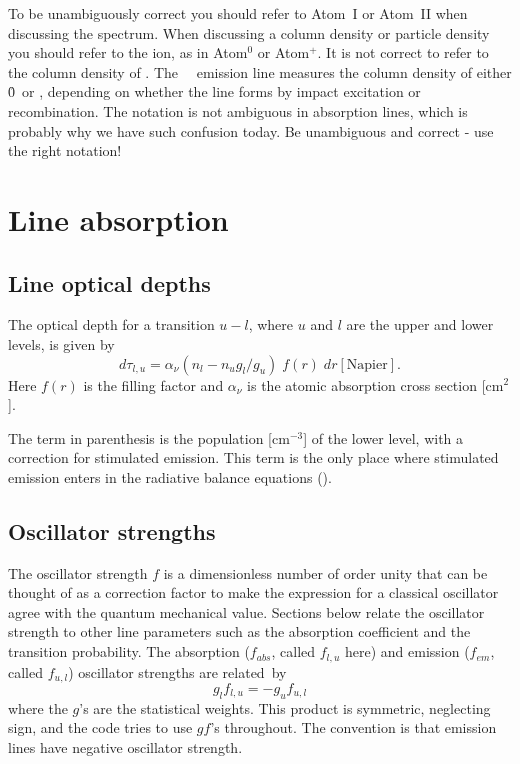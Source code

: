 To be unambiguously correct you should refer to Atom~I or Atom~II when
discussing the spectrum.
When discussing a column density or particle
density you should refer to the ion, as in Atom$^0$ or Atom$^+$.
It is not correct
to refer to the column density of \hi.
The \la\ \hi\  emission
line measures the column density of either \h0\ or \hplus,
depending on whether the line forms by impact excitation or recombination.
The notation is not ambiguous in absorption lines, which is probably why
we have such confusion today.
Be unambiguous and correct - use the right notation!

\section{Line absorption }

\subsection{Line optical depths}

The optical depth for a transition $u-l$,  where $u$ and $l$ are the upper
and lower levels, is given by
\begin{equation}
\label{eqn:OpticalDepthIncrement}
d{\tau _{l,u}} = {\alpha _\nu }\left( {{n_l} - {n_u}{g_l}/{g_u}}
\right)\;f(r)\;dr
 [\mathrm{Napier}].
\end{equation}
Here $f (r)$ is the filling factor and $\alpha _\nu$ is the
atomic absorption cross section [cm$^2$].

The term in parenthesis is the population [cm$^{-3}$] of the lower level,
with a correction for stimulated emission.
This term is the only place where
stimulated emission enters in the radiative balance equations (\citealp{Elitzur1983}).

\subsection{Oscillator strengths}

The oscillator strength $f$ is a dimensionless number of order unity that
can be thought of as a correction factor to make the expression for a
classical oscillator agree with the quantum mechanical value.
Sections
below relate the oscillator strength to other line parameters such as the
absorption coefficient and the transition probability.
The absorption
($f_{abs}$,
called $f_{l,u}$ here) and emission ($f_{em}$, called $f_{u,l}$)
oscillator strengths are related~by
\begin{equation}
{g_l}{f_{l,u}} =  - {g_u}{f_{u,l}}%
\end{equation}
where the $g$'s are the statistical weights.
This product is symmetric,
neglecting sign, and the code tries to use $gf$'s throughout.
The convention
is that emission lines have negative oscillator strength.

